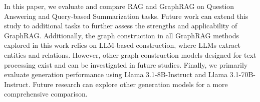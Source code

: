 In this paper, we evaluate and compare RAG and GraphRAG on Question Answering and Query-based Summarization tasks. Future work can extend this study to additional tasks to further assess the strengths and  applicability of GraphRAG. Additionally, the graph construction in all GraphRAG methods explored in this work relies on LLM-based construction, where LLMs extract entities and relations. However, other graph construction models designed for text processing exist and can be investigated in future studies. Finally, we primarily evaluate generation performance using Llama 3.1-8B-Instruct and Llama 3.1-70B-Instruct. Future research can explore other generation models for a more comprehensive comparison.